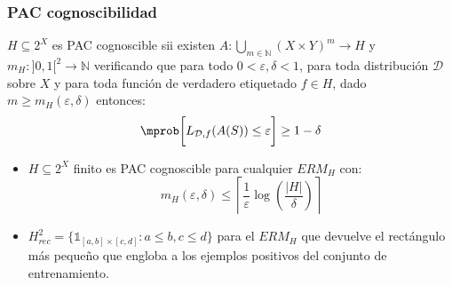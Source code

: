 \begin{frame}\frametitle{PAC cognoscibilidad}
 \begin{definition}
 \justifying
 $H \subseteq 2^X$ es PAC cognoscible sii existen $A: \underset{m\in \mathbb{N}}{\bigcup} (X\times Y)^m \rightarrow H$ 
 y $m_{H} : ]0,1[^2\rightarrow \mathbb{N}$ verificando que para todo
 $0 < \varepsilon, \delta < 1$, para toda distribución $\mathcal{D}$ sobre $X$
 y para toda función de verdadero etiquetado $f\in H$, dado $m \ge m_H(\varepsilon, \delta)$ entonces:
 \[
   \mprob \bigg[L_{\mathcal{D},f}(A(S)) \le \varepsilon \bigg] \ge 1-\delta
 \]
 \end{definition}

\begin{example}
 \begin{itemize}
  \item $H \subseteq 2^{X}$ finito es PAC cognoscible para cualquier $ERM_H$ con:
  \[m_H(\varepsilon, \delta) \le \left\lceil \frac{1}{\varepsilon} \log\left(\frac{|H|}{\delta} \right) \right\rceil\]
  \item  $H^2_{rec} = \{ \mathds{1}_{[a,b]\times [c,d]}: a\le b, c\le d\}$ para el $ERM_H$ que devuelve el rectángulo más 
  pequeño que engloba a los ejemplos positivos del conjunto de entrenamiento.
 \end{itemize}
\end{example}

\end{frame}

